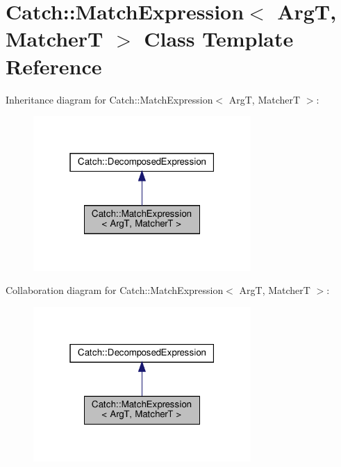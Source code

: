 \hypertarget{classCatch_1_1MatchExpression}{}\section{Catch\+:\+:Match\+Expression$<$ ArgT, MatcherT $>$ Class Template Reference}
\label{classCatch_1_1MatchExpression}


Inheritance diagram for Catch\+:\+:Match\+Expression$<$ ArgT, MatcherT $>$\+:
\nopagebreak
\begin{figure}[H]
\begin{center}
\leavevmode
\includegraphics[width=235pt]{classCatch_1_1MatchExpression__inherit__graph}
\end{center}
\end{figure}


Collaboration diagram for Catch\+:\+:Match\+Expression$<$ ArgT, MatcherT $>$\+:
\nopagebreak
\begin{figure}[H]
\begin{center}
\leavevmode
\includegraphics[width=235pt]{classCatch_1_1MatchExpression__coll__graph}
\end{center}
\end{figure}
